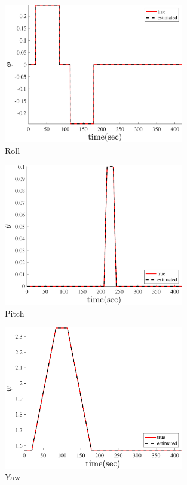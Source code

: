     \begin{figure}
        \centering
        \includegraphics[width=0.7\textwidth]{../Figure/Q5/phi_q}
        \caption{Roll}
    \end{figure}
    \begin{figure}
        \centering
        \includegraphics[width=0.7\textwidth]{../Figure/Q5/theta_q}
        \caption{Pitch}
    \end{figure}
    \begin{figure}
        \centering
        \includegraphics[width=0.7\textwidth]{../Figure/Q5/psi_q}
        \caption{Yaw}
    \end{figure}
